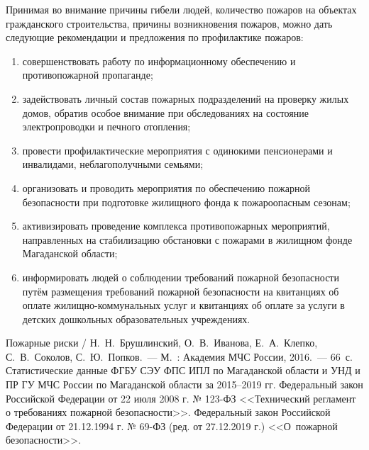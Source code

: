 Принимая во внимание причины гибели людей, количество пожаров на объектах гражданского строительства, причины возникновения пожаров, можно дать следующие рекомендации и предложения по профилактике пожаров:
\begin{enumerate}[noitemsep]\vspace{-8pt}
  \item совершенствовать работу по информационному обеспечению и противопожарной пропаганде;
  \item задействовать личный состав пожарных подразделений на проверку жилых домов, обратив особое внимание при обследованиях на состояние электропроводки и печного отопления;
  \item провести профилактические мероприятия с одинокими пенсионерами и инвалидами, неблагополучными семьями;
  \item организовать и проводить мероприятия по обеспечению пожарной безопасности при подготовке жилищного фонда к пожароопасным сезонам;
  \item активизировать проведение комплекса противопожарных мероприятий, направленных на стабилизацию обстановки с пожарами в жилищном фонде Магаданской области;
  \item информировать людей о соблюдении требований пожарной безопасности путём размещения требований пожарной безопасности на квитанциях об оплате жилищно-коммунальных услуг и квитанциях об оплате за услуги в детских дошкольных образовательных учреждениях.
\end{enumerate}
\vspace{-8pt}

\begin{thebibliography}{99}
\bibitem{}Пожарные риски / Н.~Н.~Брушлинский, О.~В.~Иванова, Е.~А.~Клепко, С.~В.~Соколов, С.~Ю.~Попков.~--- М.~: Академия МЧС России, 2016.~--- 66~с.
\bibitem{}Статистические данные ФГБУ СЭУ ФПС ИПЛ по Магаданской области и УНД и ПР ГУ МЧС России по Магаданской области за 2015--2019 гг.
\bibitem{}Федеральный закон Российской Федерации от 22 июля 2008 г. № 123-ФЗ  <<Технический регламент о требованиях пожарной безопасности>>.
\bibitem{}Федеральный закон Российской Федерации от 21.12.1994 г. № 69-ФЗ (ред. от 27.12.2019 г.) <<О~пожарной безопасности>>.
\end{thebibliography}
